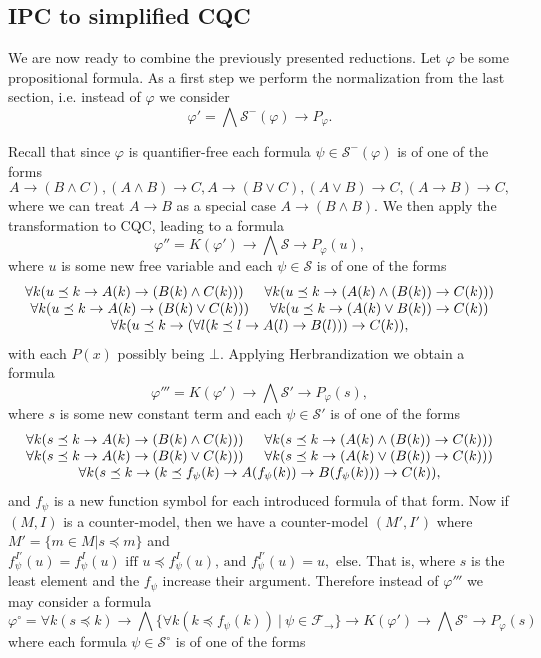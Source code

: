 \documentclass[a4paper,11pt]{report}
\theoremstyle{definition}
\theoremstyle{definition}
\theoremstyle{definition}
\theoremstyle{definition}
\theoremstyle{definition}
\theoremstyle{definition}
\theoremstyle{definition}
\begin{document}
	\subsection{IPC to simplified CQC}
	
	We are now ready to combine the previously presented reductions.
	Let $\varphi$ be some propositional formula. As a first step we perform the normalization from the last section, i.e. instead of $\varphi$ we consider $$\varphi' = \bigwedge \mathcal S^-(\varphi)\to P_\varphi.$$
	
	Recall that since $\varphi$ is quantifier-free each formula $\psi\in\mathcal S^-(\varphi)$ is of one of the forms
	$$A\to (B\wedge C), (A\wedge B)\to C, A\to (B\vee C), (A\vee B)\to C, (A\to B)\to C,$$
	where we can treat $A\to B$ as a special case $A\to (B\wedge B)$. We then apply the transformation to CQC, leading to a formula
	$$\varphi'' = K(\varphi')\to\bigwedge  \mathcal S\to P_\varphi(u),$$
	where $u$ is some new free variable and each $\psi\in\mathcal S$ is of one of the forms
	$$\begin{matrix}
		\forall k(u\preceq k\to A(k)\to (B(k)\wedge C(k)))\indent  \forall k(u\preceq k\to (A(k)\wedge (B(k))\to C(k)))\\
		\forall k(u\preceq k\to A(k)\to (B(k)\vee C(k)))\indent \forall k(u\preceq k\to (A(k)\vee B(k))\to C(k))\\
		\forall k(u\preceq k\to (\forall l(k\preceq l \to A(l)\to B(l)))\to C(k)),
	\end{matrix}$$
	with each $P(x)$ possibly being $\bot$. Applying Herbrandization we obtain a formula
	$$\varphi''' = K(\varphi')\to \bigwedge \mathcal S'\to P_\varphi(s),$$
	where $s$ is some new constant term and each $\psi\in\mathcal S'$ is of one of the forms
	$$\begin{matrix}
		\forall k(s\preceq k\to A(k)\to (B(k)\wedge C(k)))\indent \forall k(s\preceq k\to (A(k)\wedge (B(k))\to C(k)))\\
		\forall k(s\preceq k\to A(k)\to (B(k)\vee C(k)))\indent \forall k(s\preceq k\to (A(k)\vee (B(k))\to C(k)))\\
		\forall k(s\preceq k\to (k\preceq f_\psi(k) \to A(f_\psi(k))\to B(f_\psi(k)))\to C(k)),\\
	\end{matrix}$$
	and $f_\psi$ is a new function symbol for each introduced formula of that form. Now if $(M, I)$ is a counter-model, then we have a counter-model $(M',I')$ where $M' = \{m\in M|s\preceq m\}$ and
	$f_\psi^{I'}(u) = f^I_\psi(u) \text{ iff $u\preceq f^{I}_\psi(u)$, and $f_\psi^{I'}(u) = u,$ else.}$ That is, where $s$ is the least element and the $f_\psi$ increase their argument. Therefore instead of $\varphi'''$ we may consider a formula $$\varphi^\circ = \forall k(s\preceq k)\to \bigwedge\{\forall k(k\preceq f_\psi(k))\:|\:\psi\in\mathcal F_\to\}\to K(\varphi')\to \bigwedge \mathcal S^\circ\to P_\varphi(s)$$ where each formula $\psi\in\mathcal S^\circ$ is of one of the forms
\end{document}
